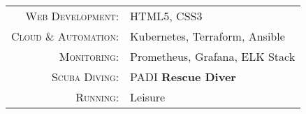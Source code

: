 %
%
%


\begin{tabular}{rl}
    \textsc{Web Development:} & HTML5, CSS3 \\
    \textsc{Cloud \& Automation:} & Kubernetes, Terraform, Ansible \\
    \textsc{Monitoring:} & Prometheus, Grafana, ELK Stack \\
    \textsc{Scuba Diving:} & PADI \textbf{Rescue Diver} \\
    \textsc{Running:} & Leisure \\
\end{tabular}
